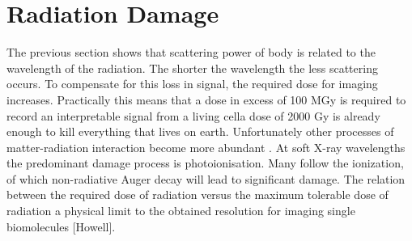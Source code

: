 \section{Radiation Damage}
The previous section shows that scattering power of \DIFdelbegin {}\DIFdelend \DIFaddbegin {}\DIFaddend body is related
to the wavelength of the radiation. The shorter the wavelength the
less scattering occurs. To compensate for this loss in signal, the
required dose for imaging increases. Practically this means that a
dose in excess of 100 MGy is required to record an interpretable
signal from a living cell\DIFdelbegin \DIFdel{(}\DIFdelend \DIFaddbegin {}\DIFaddend a dose of 2000 Gy is already enough to kill everything
that lives on earth\DIFdelbegin \DIFdel{)}\DIFdelend . Unfortunately other processes of matter-radiation
interaction \DIFaddbegin {}\DIFaddend become more abundant \DIFdelbegin {}\DIFdelend \DIFaddbegin {}\DIFaddend . At
soft X-ray wavelengths the predominant damage process is
photoionisation. Many \DIFdelbegin {}\DIFdelend \DIFaddbegin {}\DIFaddend follow the ionization, of which
non-radiative Auger decay will lead to significant \DIFdelbegin {}\DIFdelend damage. The
relation between the required dose of radiation versus the maximum
tolerable dose of radiation \DIFdelbegin {}\DIFdelend \DIFaddbegin {}\DIFaddend a physical limit to the obtained
resolution for imaging single biomolecules [Howell].

